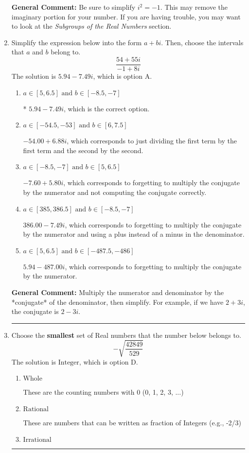 \documentclass{extbook}[14pt]
\newcommand{\litem}[1]{\item #1

\rule{\textwidth}{0.4pt}}
\begin{document}
\begin{enumerate}
{\textbf{General Comment:} Be sure to simplify $i^2 = -1$. This may remove the imaginary portion for your number. If you are having trouble, you may want to look at the \textit{Subgroups of the Real Numbers} section.
}
\litem{
Simplify the expression below into the form $a+bi$. Then, choose the intervals that $a$ and $b$ belong to.
\[ \frac{54 + 55 i}{-1 + 8 i} \]The solution is \( 5.94  - 7.49 i \), which is option A.\begin{enumerate}[label=\Alph*.]
\item \( a \in [5, 6.5] \text{ and } b \in [-8.5, -7] \)

* $5.94  - 7.49 i$, which is the correct option.
\item \( a \in [-54.5, -53] \text{ and } b \in [6, 7.5] \)

 $-54.00  + 6.88 i$, which corresponds to just dividing the first term by the first term and the second by the second.
\item \( a \in [-8.5, -7] \text{ and } b \in [5, 6.5] \)

 $-7.60  + 5.80 i$, which corresponds to forgetting to multiply the conjugate by the numerator and not computing the conjugate correctly.
\item \( a \in [385, 386.5] \text{ and } b \in [-8.5, -7] \)

 $386.00  - 7.49 i$, which corresponds to forgetting to multiply the conjugate by the numerator and using a plus instead of a minus in the denominator.
\item \( a \in [5, 6.5] \text{ and } b \in [-487.5, -486] \)

 $5.94  - 487.00 i$, which corresponds to forgetting to multiply the conjugate by the numerator.
\end{enumerate}

\textbf{General Comment:} Multiply the numerator and denominator by the *conjugate* of the denominator, then simplify. For example, if we have $2+3i$, the conjugate is $2-3i$.
}
\litem{
Choose the \textbf{smallest} set of Real numbers that the number below belongs to.
\[ -\sqrt{\frac{42849}{529}} \]The solution is \( \text{Integer} \), which is option D.\begin{enumerate}[label=\Alph*.]
\item \( \text{Whole} \)

These are the counting numbers with 0 (0, 1, 2, 3, ...)
\item \( \text{Rational} \)

These are numbers that can be written as fraction of Integers (e.g., -2/3)
\item \( \text{Irrational} \)


\end{enumerate}}
\end{enumerate}
\end{document}
